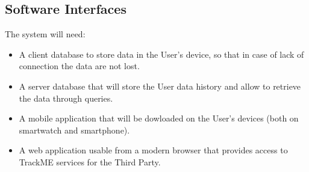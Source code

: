 \subsection{Software Interfaces}
The system will need:
\begin{itemize}
    \item A client database to store data in the User’s device, so that in case of lack of     connection the data are not lost.
    \item A server database that will store the User data history and allow to retrieve the     data through queries.
    \item A mobile application that will be dowloaded on the User’s devices (both on             smartwatch and smartphone).
    \item A web application usable from a modern browser that provides access to TrackME services for the Third Party.
\end{itemize}


	
